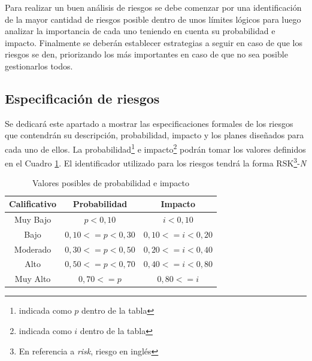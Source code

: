 Para realizar un buen análisis de riesgos se debe comenzar por una identificación de la mayor cantidad de riesgos posible dentro de unos límites lógicos para luego analizar la importancia de cada uno teniendo en cuenta su probabilidad e impacto. Finalmente se deberán establecer estrategias a seguir en caso de que los riesgos se den, priorizando los más importantes en caso de que no sea posible gestionarlos todos.

\subsection{Especificación de riesgos}

Se dedicará este apartado a mostrar las especificaciones formales de los riesgos que contendrán su descripción, probabilidad, impacto y los planes diseñados para cada uno de ellos. La probabilidad\footnote{indicada como $p$ dentro de la tabla}  e impacto\footnote{indicada como $i$ dentro de la tabla} podrán tomar los valores definidos en el Cuadro \ref{tab:probabilidad_impacto}. El identificador utilizado para los riesgos tendrá la forma RSK\footnote{En referencia a \textit{risk}, riesgo en inglés}-\textit{N}


\begin{table}
	\begin{center}
		\caption{Valores posibles de probabilidad e impacto}
		\label{tab:probabilidad_impacto}
	\begin{tabular}{ | c | c | c | } 
		\hline
		
		\textbf{Calificativo} &
		\textbf{Probabilidad}&
		\textbf{Impacto}\\
		
		\hline
		Muy Bajo 
		&
		$p<0,10$
		&
		$i<0,10$
		\\ 
		
		\hline
		Bajo 
		&
		$0,10<=p<0,30$
		&
		$0,10<=i<0,20$
		\\ 
		
		\hline
		Moderado 
		&
		$0,30<=p<0,50$
		&
		$0,20<=i<0,40$
		\\ 
		
		\hline
		Alto 
		&
		$0,50<=p<0,70$
		&
		$0,40<=i<0,80$
		\\ 
		
		\hline
		Muy Alto 
		&
		$0,70<=p$
		&
		$0,80<=i$
		\\ 
		
		
		\hline
	\end{tabular}
\end{center}
\end{table}

